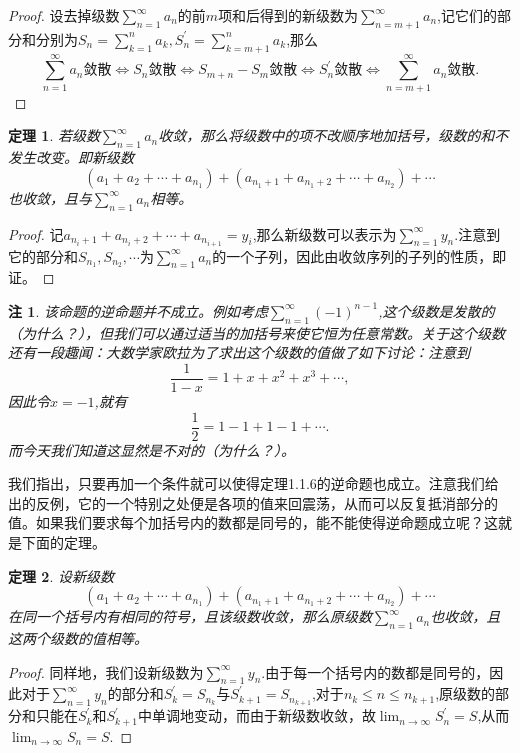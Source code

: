 \documentclass{article}
\newtheorem{theorem}{定理}[subsection]
\newtheorem{note}{注}[subsection]
\begin{document}
\begin{proof}
设去掉级数$\sum_{n=1}^\infty a_n$的前$m$项和后得到的新级数为$\sum_{n=m+1}^\infty a_n$,记它们的部分和分别为$S_n=\sum_{k=1}^na_k,S_n^\prime=\sum_{k=m+1}^na_k$,那么
$$
\sum_{n=1}^{\infty}{a_n}\text{敛散}\Leftrightarrow S_n\text{敛散}\Leftrightarrow S_{m+n}-S_m\text{敛散}\Leftrightarrow S_{n}^{\prime}\text{敛散}\Leftrightarrow \sum_{n=m+1}^{\infty}{a_n}\text{敛散}.
$$
\end{proof}
\begin{theorem}
若级数$\sum_{n=1}^\infty a_n$收敛，那么将级数中的项不改顺序地加括号，级数的和不发生改变。即新级数
$$
\left( a_1+a_2+\cdots +a_{n_1} \right) +\left( a_{n_1+1}+a_{n_1+2}+\cdots +a_{n_2} \right) +\cdots 
$$
也收敛，且与$\sum_{n=1}^\infty a_n$相等。
\end{theorem}
\begin{proof}
记$a_{n_i+1}+a_{n_i+2}+\cdots+a_{n_{i+1}}=y_i$,那么新级数可以表示为$\sum_{n=1}^\infty y_n$.注意到它的部分和$S_{n_1},S_{n_2},\cdots$为$\sum_{n=1}^\infty a_n$的一个子列，因此由收敛序列的子列的性质，即证。
\end{proof}
\begin{note}
该命题的逆命题并不成立。例如考虑$\sum_{n=1}^\infty(-1)^{n-1}$,这个级数是发散的（为什么？），但我们可以通过适当的加括号来使它恒为任意常数。关于这个级数还有一段趣闻：大数学家欧拉为了求出这个级数的值做了如下讨论：注意到
$$
\frac{1}{1-x}=1+x+x^2+x^3+\cdots ,
$$
因此令$x=-1$,就有
$$
\frac{1}{2}=1-1+1-1+\cdots .
$$
而今天我们知道这显然是不对的（为什么？）。
\end{note}
我们指出，只要再加一个条件就可以使得定理1.1.6的逆命题也成立。注意我们给出的反例，它的一个特别之处便是各项的值来回震荡，从而可以反复抵消部分的值。如果我们要求每个加括号内的数都是同号的，能不能使得逆命题成立呢？这就是下面的定理。
\begin{theorem}
设新级数
$$
\left( a_1+a_2+\cdots +a_{n_1} \right) +\left( a_{n_1+1}+a_{n_1+2}+\cdots +a_{n_2} \right) +\cdots 
$$
在同一个括号内有相同的符号，且该级数收敛，那么原级数$\sum_{n=1}^\infty a_n$也收敛，且这两个级数的值相等。
\end{theorem}
\begin{proof}
同样地，我们设新级数为$\sum_{n=1}^\infty y_n$.由于每一个括号内的数都是同号的，因此对于$\sum_{n=1}^\infty y_n$的部分和$S_k^\prime=S_{n_k}$与$S_{k+1}^\prime=S_{n_{k+1}}$,对于$n_{k}\le n\le n_{k+1}$,原级数的部分和只能在$S_k^\prime$和$S_{k+1}^\prime$中单调地变动，而由于新级数收敛，故$\lim_{n\to\infty}S_n^\prime=S$,从而$\lim_{n\to\infty}S_n=S$.
\end{proof}
\end{document}
